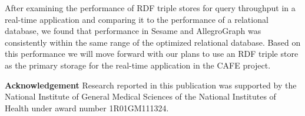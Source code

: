 \documentclass{llncs}
\begin{document}
After examining the performance of RDF triple stores for query throughput in a real-time application and comparing it to the performance of a relational database, we found that performance in Sesame and AllegroGraph was consistently within the same range of the optimized relational database.
Based on this performance we will move forward with our plans to use an RDF triple store as the primary storage for the real-time application in the CAFE project.

\medskip
\noindent
\textbf{Acknowledgement} Research reported in this publication was supported by the National Institute of General Medical Sciences of the National Institutes of Health under award number 1R01GM111324.



\end{document}
